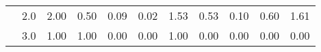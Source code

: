 \begin{tabular}{llrrrrrrrrr}
       & 2.0 &               2.00 &                     0.50 &                                 0.09 &                             0.02 &                           1.53 &                                               0.53 &                                            0.10 &                                            0.60 &                                        1.61 \\
       & 3.0 &               1.00 &                     1.00 &                                 0.00 &                             0.00 &                           1.00 &                                               0.00 &                                            0.00 &                                            0.00 &                                        0.00 \\
\bottomrule
\end{tabular}
